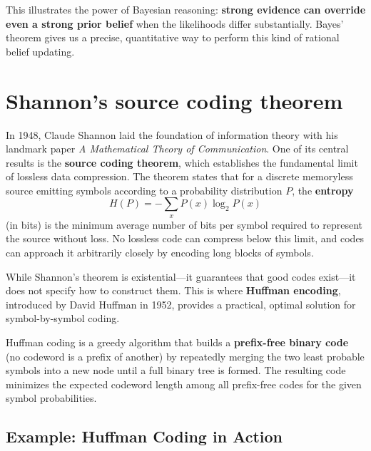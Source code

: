 \documentclass[11pt]{article}
\begin{document}
This illustrates the power of Bayesian reasoning: \textbf{strong evidence can override even a strong prior belief} when the likelihoods differ substantially. Bayes' theorem gives us a precise, quantitative way to perform this kind of rational belief updating.











\section{Shannon’s source coding theorem}




In 1948, Claude Shannon laid the foundation of information theory with his landmark paper \emph{A Mathematical Theory of Communication}. One of its central results is the \textbf{source coding theorem}, which establishes the fundamental limit of lossless data compression. The theorem states that for a discrete memoryless source emitting symbols according to a probability distribution \(P\), the \textbf{entropy}
\[
H(P) = -\sum_{x} P(x) \log_2 P(x)
\]
(in bits) is the minimum average number of bits per symbol required to represent the source without loss. No lossless code can compress below this limit, and codes can approach it arbitrarily closely by encoding long blocks of symbols.

While Shannon’s theorem is existential—it guarantees that good codes exist—it does not specify how to construct them. This is where \textbf{Huffman encoding}, introduced by David Huffman in 1952, provides a practical, optimal solution for symbol-by-symbol coding.

Huffman coding is a greedy algorithm that builds a \textbf{prefix-free binary code} (no codeword is a prefix of another) by repeatedly merging the two least probable symbols into a new node until a full binary tree is formed. The resulting code minimizes the expected codeword length among all prefix-free codes for the given symbol probabilities.

\subsection*{Example: Huffman Coding in Action}
\end{document}
